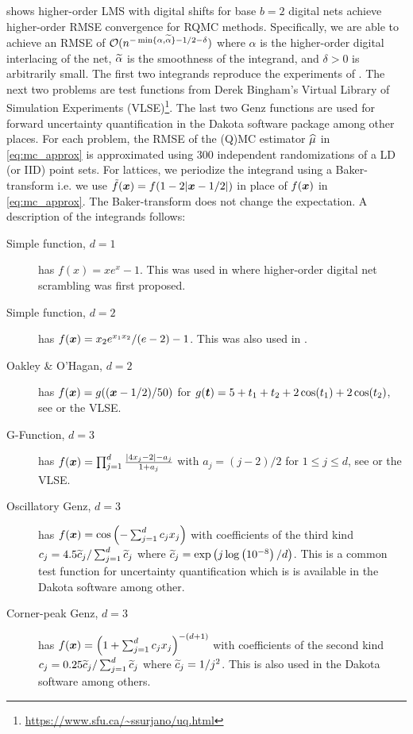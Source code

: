 \documentclass[acmsmall]{acmart}
\begin{document}
 shows higher-order LMS with digital shifts for base $b=2$ digital nets achieve higher-order RMSE convergence for RQMC methods. Specifically, we are able to achieve an RMSE of ${\mathcal{O}}(n^{-\min\{\alpha,{\widetilde{\alpha}}\}-1/2-\delta})$ where $\alpha$ is the higher-order digital interlacing of the net, ${\widetilde{\alpha}}$ is the smoothness of the integrand, and $\delta>0$ is arbitrarily small.  The first two integrands reproduce the experiments of \citep{dick.higher_order_scrambled_digital_nets}. The next two problems are test functions from Derek Bingham's Virtual Library of Simulation Experiments (VLSE)\footnote{\label{fn:VLSE}\url{https://www.sfu.ca/~ssurjano/uq.html}}. The last two Genz functions are used for forward uncertainty quantification in the Dakota software package \citep{adams2020dakota} among other places. For each problem, the RMSE of the (Q)MC estimator ${\widehat{\mu}}$ in \eqref{eq:mc_approx} is approximated using $300$ independent randomizations of a LD (or IID) point sets. For lattices, we periodize the integrand using a Baker-transform i.e. we use $\tilde{f}({\boldsymbol{x}}) = f(1-2\lvert {\boldsymbol{x}}-1/2\rvert)$ in place of $f({\boldsymbol{x}})$ in \eqref{eq:mc_approx}. The Baker-transform does not change the expectation. A description of the integrands follows:
\begin{description}
    \item[Simple function, $d=1$] has $f(x) = x e^x-1$. This was used in \citep{dick.higher_order_scrambled_digital_nets} where higher-order digital net scrambling was first proposed.
    \item[Simple function, $d=2$] has $f({\boldsymbol{x}}) = x_2 e^{x_1 x_2}/(e-2)-1$. This was also used in \citep{dick.higher_order_scrambled_digital_nets}.
    \item[Oakley \& O'Hagan, $d=2$] has $f({\boldsymbol{x}}) = g(({\boldsymbol{x}}-1/2)/50)$ for $g({\boldsymbol{t}}) = 5+t_1+t_2+2\cos(t_1)+2\cos(t_2)$, see \citep{oakley2002bayesian} or the VLSE.
    \item[G-Function, $d=3$] has $f({\boldsymbol{x}}) = \prod_{j=1}^d \frac{\lvert 4x_j-2\rvert-a_j}{1+a_j}$ with $a_j = (j-2)/2$ for $1 \leq j \leq d$, see  \citep{crestaux2007polynomial,marrel2009calculations} or the VLSE. 
    \item[Oscillatory Genz, $d=3$] has $f({\boldsymbol{x}}) = \cos\left(-\sum_{j=1}^d c_j x_j \right)$ with coefficients of the third kind $c_j = 4.5 {\widetilde{c}}_j/\sum_{j=1}^d {\widetilde{c}}_j$ where ${\widetilde{c}}_j = \exp\left(j \log\left(10^{-8}\right)/d\right)$. This is a common test function for uncertainty quantification which is is available in the Dakota software \citep{adams2020dakota} among other.  
    \item[Corner-peak Genz, $d=3$] has $f({\boldsymbol{x}}) = \left(1+\sum_{j=1}^d c_j x_j\right)^{-(d+1)}$ with coefficients of the second kind $c_j = 0.25 {\widetilde{c}}_j/\sum_{j=1}^d {\widetilde{c}}_j$ where ${\widetilde{c}}_j = 1/j^2$. This is also used in the Dakota software \citep{adams2020dakota} among others. 
\end{description}
\end{document}
